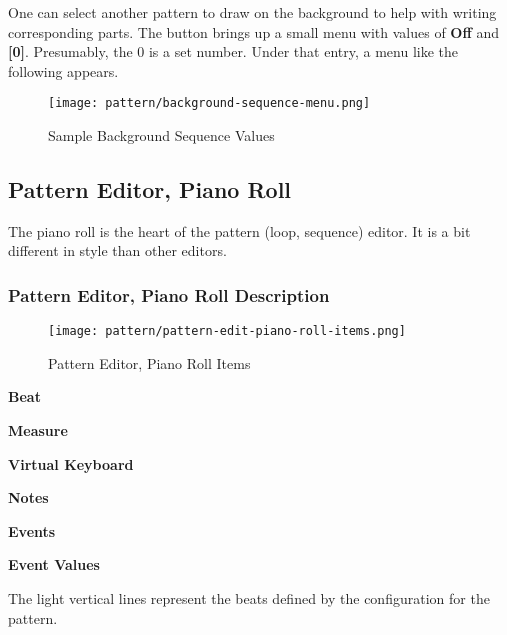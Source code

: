    One can select another pattern to draw on the background to help with
   writing corresponding parts.
   The button brings up a small menu with values of \textbf{Off} and
   \textbf{[0]}.  Presumably, the 0 is a set number.  Under that entry, a
   menu like the following appears.

\begin{figure}[H]
   \centering 
   \texttt{[image: pattern/background-sequence-menu.png]}
   \caption{Sample Background Sequence Values}
   \label{fig:pattern_editor_background_sequence_menu}
\end{figure}

\subsection{Pattern Editor, Piano Roll}
\label{subsec:seq24_pattern_editor_piano_roll}

   The piano roll is the heart of the pattern (loop, sequence) editor.
   It is a bit different in style than other editors.

\subsubsection{Pattern Editor, Piano Roll Description}
\label{subsubsec:seq24_pattern_editor_piano_roll_description}

\begin{figure}[H]
   \centering 
   \texttt{[image: pattern/pattern-edit-piano-roll-items.png]}
   \caption{Pattern Editor, Piano Roll Items}
   \label{fig:pattern_editor_piano_roll_items}
\end{figure}

   \begin{enumber}
      \item \textbf{Beat}
      \item \textbf{Measure}
      \item \textbf{Virtual Keyboard}
      \item \textbf{Notes}
      \item \textbf{Events}
      \item \textbf{Event Values}
   \end{enumber}

   \setcounter{ItemCounter}{0}      %

   The light vertical lines represent the beats defined by the configuration
   for the pattern.

